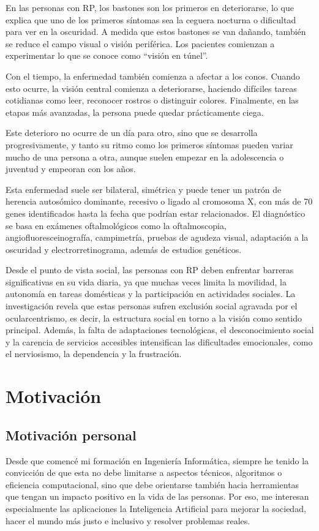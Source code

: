 \documentclass[11pt,spanish,listoffigures,listoftables]{tfgetsinf}
\begin{document}
En las personas con \ac{RP}, los bastones son los primeros en deteriorarse, lo que explica que uno de los primeros síntomas sea la ceguera nocturna o dificultad para ver en la oscuridad. A medida que estos bastones se van dañando, también se reduce el campo visual o visión periférica. Los pacientes comienzan a experimentar lo que se conoce como “visión en túnel”.

Con el tiempo, la enfermedad también comienza a afectar a los conos. Cuando esto ocurre, la visión central comienza a deteriorarse, haciendo difíciles tareas cotidianas como leer, reconocer rostros o distinguir colores. Finalmente, en las etapas más avanzadas, la persona puede quedar prácticamente ciega. 

Este deterioro no ocurre de un día para otro, sino que se desarrolla progresivamente, y tanto su ritmo como los primeros síntomas pueden variar mucho de una persona a otra, aunque suelen empezar en la adolescencia o juventud y empeoran con los años. 

Esta enfermedad suele ser bilateral, simétrica y puede tener un patrón de herencia autosómico dominante, recesivo o ligado al cromosoma X, con más de 70 genes identificados hasta la fecha que podrían estar relacionados\cite{GIL}. El diagnóstico se basa en exámenes oftalmológicos como la oftalmoscopia, angiofluoresceinografía, campimetría, pruebas de agudeza visual, adaptación a la oscuridad y electrorretinograma, además de estudios genéticos\cite{VIS}.

Desde el punto de vista social, las personas con \ac{RP} deben enfrentar barreras significativas en su vida diaria, ya que muchas veces limita la movilidad, la autonomía en tareas domésticas y la participación en actividades sociales. La investigación revela que estas personas sufren exclusión social agravada por el ocularcentrismo, es decir, la estructura social en torno a la visión como sentido principal. Además, la falta de adaptaciones tecnológicas, el desconocimiento social y la carencia de servicios accesibles intensifican las dificultades emocionales, como el nerviosismo, la dependencia y la frustración\cite{DEL}.


\section{Motivación}

\subsection{Motivación personal}
Desde que comencé mi formación en Ingeniería Informática, siempre he tenido la convicción de que esta no debe limitarse a aspectos técnicos, algoritmos o eficiencia computacional, sino que debe orientarse también hacia herramientas que tengan un impacto positivo en la vida de las personas. Por eso, me interesan especialmente las aplicaciones la Inteligencia Artificial para mejorar la sociedad, hacer el mundo más justo e inclusivo y resolver problemas reales.  
\end{document}
